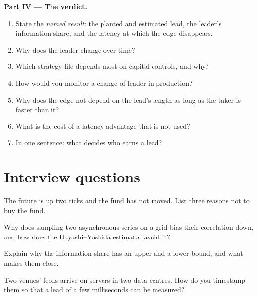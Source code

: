 \begin{problem}
\medskip\noindent\textbf{Part IV --- The verdict.}
\begin{enumerate}[resume]
\item State the \emph{named result}: the planted and estimated lead, the leader's information share, and the latency at which the edge disappears.
\item Why does the leader change over time?
\item Which strategy file depends most on capital controls, and why?
\item How would you monitor a change of leader in production?
\item Why does the edge not depend on the lead's length as long as the taker is faster than it?
\item What is the cost of a latency advantage that is not used?
\item In one sentence: what decides who earns a lead?
\end{enumerate}
\end{problem}

\section{Interview questions}

\begin{interviewq}\label{iq:hf:lead-lag-and-cross-venue-trading:1}
The future is up two ticks and the fund has not moved. List three reasons not to buy the fund.
\end{interviewq}

\begin{interviewq}\label{iq:hf:lead-lag-and-cross-venue-trading:2}
Why does sampling two asynchronous series on a grid bias their correlation down, and how does the Hayashi--Yoshida estimator avoid it?
\end{interviewq}

\begin{interviewq}\label{iq:hf:lead-lag-and-cross-venue-trading:3}
Explain why the information share has an upper and a lower bound, and what makes them close.
\end{interviewq}

\begin{interviewq}\label{iq:hf:lead-lag-and-cross-venue-trading:4}
Two venues' feeds arrive on servers in two data centres. How do you timestamp them so that a lead of a few milliseconds can be measured?
\end{interviewq}

